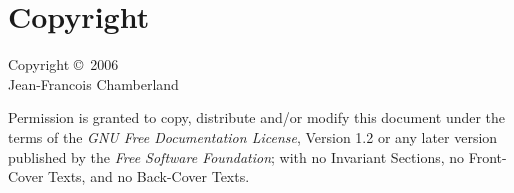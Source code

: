\documentclass[12pt,openany]{book}
\begin{document}
\frontmatter

\chapter*{Copyright}
Copyright \copyright\ 2006 \\
Jean-Francois Chamberland

Permission is granted to copy, distribute and/or modify this document under the terms of the \emph{GNU Free Documentation License}, Version 1.2 or any later version published by the \emph{Free Software Foundation}; with no Invariant Sections, no Front-Cover Texts, and no Back-Cover Texts.

\tableofcontents

\mainmatter










\appendix

%
\end{document}
